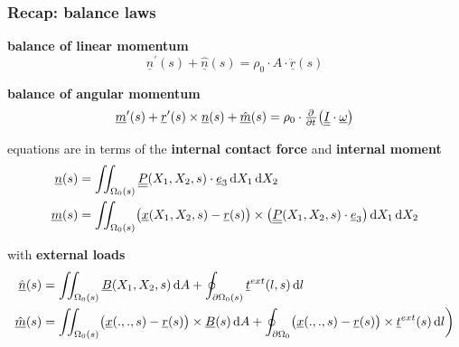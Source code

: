 \begin{frame}
  \frametitle{Recap: balance laws}

  \textbf{balance of linear momentum}
  \begin{displaymath}
    \underline{n}^{\prime}(s) + \underline{\hat{n}}(s) =
    \rho_0 \cdot A \cdot \underline{\ddot{r}}(s)
  \end{displaymath}
  
  \vspace{0.5em}
  \textbf{balance of angular momentum}
  \begin{displaymath}
    \underline{m}^{\prime}(s) + \underline{r}^{\prime}(s) \times \underline{n}(s) + \underline{\hat{m}}(s) =
    \rho_0 \cdot
    \pd{}{t} \bigl( \doubleunderline{I} \cdot \underline{\omega} \bigr)
  \end{displaymath}
  
  \vspace{0.5em}
  equations are in terms of the \textbf{internal contact force} and \textbf{internal moment}
  \begin{displaymath}
    \begin{alignedat}{1}
      \underline{n}(s) &= \iint_{\Omega_0(s)} \doubleunderline{P}(X_1, X_2, s) \cdot \underline{e}_3 \dif X_1 \dif X_2 \\
      \underline{m}(s) &= \iint_{\Omega_0(s)} \bigl( \underline{x}(X_1,X_2,s) - \underline{r}(s) \bigr) \times \bigl( \doubleunderline{P}(X_1,X_2,s) \cdot \underline{e}_3 \bigr) \dif X_1 \dif X_2 %
    \end{alignedat}
  \end{displaymath}
  
  \vspace{0.5em}
  with \textbf{external loads}
  \begin{displaymath}
    \begin{alignedat}{1}
      \underline{\hat{n}}(s) &= \iint_{\Omega_{0}(s)} \underline{B}(X_1,X_2,s) \dif A + \oint_{\partial \Omega_{0}(s)} \underline{t}^{ext}(l,s) \dif l \\
      \underline{\hat{m}}(s) &= \iint_{\Omega_{0}(s)} \bigl( \underline{x}(.,.,s) - \underline{r}(s) \bigr) \times \underline{B}(s) \dif A + \oint_{\partial \Omega_0} \bigl( \underline{x}(.,.,s) - \underline{r}(s) \bigr) \times \underline{t}^{ext}(s) \dif l \biggr)
    \end{alignedat}
  \end{displaymath}
  
\end{frame}

